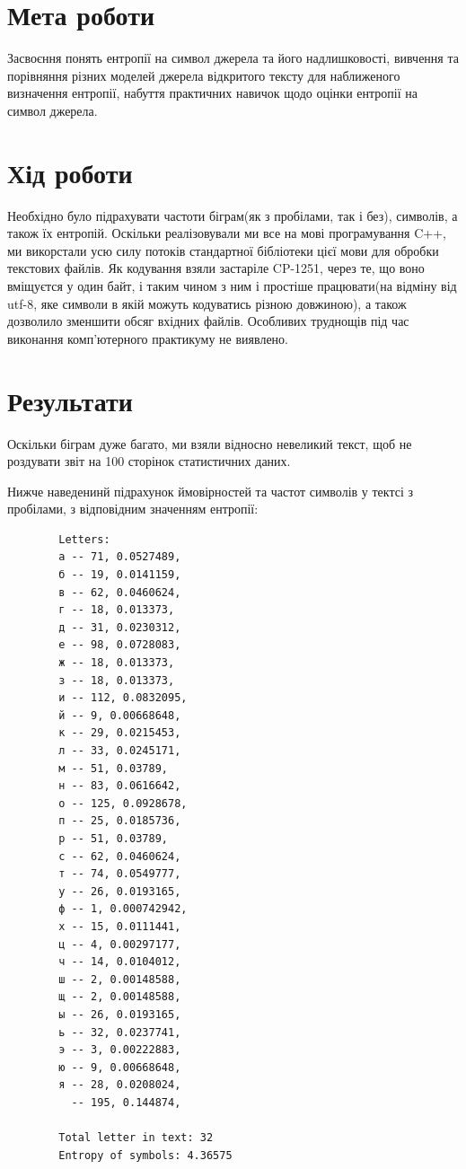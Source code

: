 \documentclass[12pt]{article}
\begin{document}
    

    \section{Мета роботи}

    Засвоєння понять ентропії на символ джерела та його надлишковості, вивчення та
    порівняння різних моделей джерела відкритого тексту для наближеного визначення
    ентропії, набуття практичних навичок щодо оцінки ентропії на символ джерела.

    \section{Хід роботи}

    Необхідно було підрахувати частоти біграм(як з пробілами, так і без), символів, а також їх ентропій.
    Оскільки реалізовували ми все на мові програмування C++, ми викорстали усю силу потоків стандартної
    бібліотеки цієї мови для обробки текстових файлів. Як кодування взяли застаріле CP-1251, через те,
    що воно вміщуєтся у один байт, і таким чином з ним і простіше працювати(на відміну від utf-8, яке символи в якій можуть кодуватись
    різною довжиною), а також дозволило зменшити обсяг вхідних файлів. Особливих труднощів під час виконання комп'ютерного
    практикуму не виявлено. 

    \section{Результати}

    Оскільки біграм дуже багато, ми взяли відносно невеликий текст, щоб не роздувати звіт на 100 сторінок статистичних даних.

    Нижче наведенинй підрахунок ймовірностей та частот символів у тектсі з пробілами, з відповідним значенням ентропії:

    \begin{verbatim}
        Letters: 
        а -- 71, 0.0527489,
        б -- 19, 0.0141159,
        в -- 62, 0.0460624,
        г -- 18, 0.013373,
        д -- 31, 0.0230312,
        е -- 98, 0.0728083,
        ж -- 18, 0.013373,
        з -- 18, 0.013373,
        и -- 112, 0.0832095,
        й -- 9, 0.00668648,
        к -- 29, 0.0215453,
        л -- 33, 0.0245171,
        м -- 51, 0.03789,
        н -- 83, 0.0616642,
        о -- 125, 0.0928678,
        п -- 25, 0.0185736,
        р -- 51, 0.03789,
        с -- 62, 0.0460624,
        т -- 74, 0.0549777,
        у -- 26, 0.0193165,
        ф -- 1, 0.000742942,
        х -- 15, 0.0111441,
        ц -- 4, 0.00297177,
        ч -- 14, 0.0104012,
        ш -- 2, 0.00148588,
        щ -- 2, 0.00148588,
        ы -- 26, 0.0193165,
        ь -- 32, 0.0237741,
        э -- 3, 0.00222883,
        ю -- 9, 0.00668648,
        я -- 28, 0.0208024,
          -- 195, 0.144874,
        
        Total letter in text: 32
        Entropy of symbols: 4.36575
        
    \end{verbatim}
\end{document}
